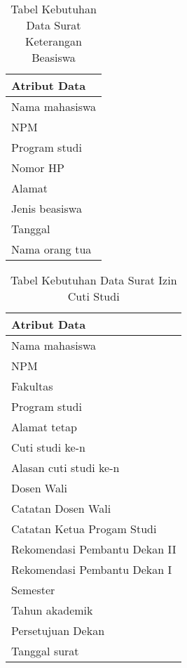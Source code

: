\begin{table}[H]
\centering
\caption{Tabel Kebutuhan Data Surat Keterangan Beasiswa}
\label{surat_keterangan_beasiswa}
\begin{tabular}{|l|}
\hline
{\textbf{Atribut Data}}                     \\ \hline
{Nama mahasiswa}                            \\ \hline 
{NPM}                                       \\ \hline 
{Program studi}                             \\ \hline
{Nomor HP}			                            \\ \hline
{Alamat}        			                     	\\ \hline
{Jenis beasiswa}                            \\ \hline 
{Tanggal}                                   \\ \hline 
{Nama orang tua}                            \\ \hline
\end{tabular}
\end{table}

\begin{table}[H]
\centering
\caption{Tabel Kebutuhan Data Surat Izin Cuti Studi}
\label{surat_izin_cuti_studi}
\begin{tabular}{|l|}
\hline
{\textbf{Atribut Data}}                     \\ \hline
{Nama mahasiswa}                            \\ \hline 
{NPM}                                       \\ \hline 
{Fakultas}                                  \\ \hline 
{Program studi}                             \\ \hline 
{Alamat tetap}                              \\ \hline
{Cuti studi ke-n}   			                	\\ \hline 
{Alasan cuti studi ke-n}                    \\ \hline
{Dosen Wali}				                        \\ \hline 
{Catatan Dosen Wali}                        \\ \hline
{Catatan Ketua Progam Studi}                \\ \hline 
{Rekomendasi Pembantu Dekan II}             \\ \hline 
{Rekomendasi Pembantu Dekan I}              \\ \hline 
{Semester}                          		    \\ \hline 
{Tahun akademik}                            \\ \hline
{Persetujuan Dekan}                         \\ \hline 
{Tanggal surat}                             \\ \hline
\end{tabular}
\end{table}

